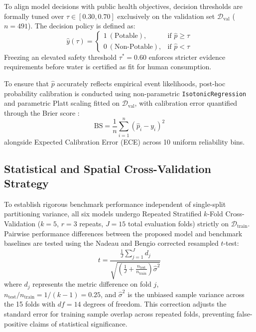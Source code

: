 \documentclass[pdflatex,sn-mathphys-num]{sn-jnl}%
\theoremstyle{thmstyleone}%
\theoremstyle{thmstyletwo}%
\theoremstyle{thmstylethree}%
\begin{document}
To align model decisions with public health objectives, decision thresholds are formally tuned over $\tau \in [0.30, 0.70]$ exclusively on the validation set $\mathcal{D}_{\text{val}}$ ($n = 491$). The decision policy is defined as:
\begin{equation}
    \hat{y}(\tau) = 
    \begin{cases} 
        1 \ (\text{Potable}), & \text{if } \hat{p} \ge \tau \\
        0 \ (\text{Non-Potable}), & \text{if } \hat{p} < \tau 
    \end{cases}
    \label{eq:threshold_rule}
\end{equation}
Freezing an elevated safety threshold $\tau^* = 0.60$ enforces stricter evidence requirements before water is certified as fit for human consumption.

To ensure that $\hat{p}$ accurately reflects empirical event likelihoods, post-hoc probability calibration is conducted using non-parametric \texttt{IsotonicRegression} \cite{zadrozny2002} and parametric Platt scaling \cite{platt1999,niculescumizil2005} fitted on $\mathcal{D}_{\text{val}}$, with calibration error quantified through the Brier score \cite{brier1950}:
\begin{equation}
    \text{BS} = \frac{1}{n} \sum_{i=1}^n (\hat{p}_i - y_i)^2
    \label{eq:brier}
\end{equation}
alongside Expected Calibration Error (ECE) across 10 uniform reliability bins.


\subsection{Statistical and Spatial Cross-Validation Strategy}\label{subsec4_6}

To establish rigorous benchmark performance independent of single-split partitioning variance, all six models undergo Repeated Stratified $k$-Fold Cross-Validation ($k = 5$, $r = 3$ repeats, $J = 15$ total evaluation folds) strictly on $\mathcal{D}_{\text{train}}$. Pairwise performance differences between the proposed model and benchmark baselines are tested using the Nadeau and Bengio corrected resampled $t$-test:
\begin{equation}
    t = \frac{\frac{1}{J} \sum_{j=1}^J d_j}{\sqrt{\left( \frac{1}{J} + \frac{n_{\text{test}}}{n_{\text{train}}} \right) \hat{\sigma}^2}}
    \label{eq:nadeau_bengio}
\end{equation}
where $d_j$ represents the metric difference on fold $j$, $n_{\text{test}} / n_{\text{train}} = 1 / (k - 1) = 0.25$, and $\hat{\sigma}^2$ is the unbiased sample variance across the 15 folds with $df = 14$ degrees of freedom. This correction adjusts the standard error for training sample overlap across repeated folds, preventing false-positive claims of statistical significance.
\end{document}
